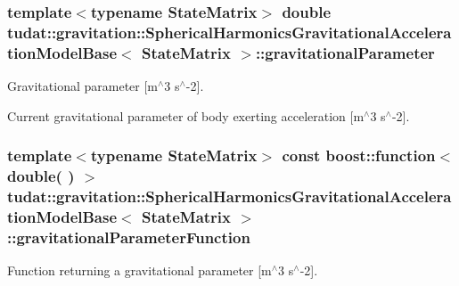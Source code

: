 \subsubsection[{\texorpdfstring{gravitational\+Parameter}{gravitationalParameter}}]{\setlength{\rightskip}{0pt plus 5cm}template$<$typename State\+Matrix$>$ double {\bf tudat\+::gravitation\+::\+Spherical\+Harmonics\+Gravitational\+Acceleration\+Model\+Base}$<$ State\+Matrix $>$\+::gravitational\+Parameter\hspace{0.3cm}{\ttfamily [protected]}}\hypertarget{classtudat_1_1gravitation_1_1SphericalHarmonicsGravitationalAccelerationModelBase_a6324fd00981daa580fab84e579de285f}{}\label{classtudat_1_1gravitation_1_1SphericalHarmonicsGravitationalAccelerationModelBase_a6324fd00981daa580fab84e579de285f}


Gravitational parameter \mbox{[}m$^\wedge$3 s$^\wedge$-\/2\mbox{]}. 

Current gravitational parameter of body exerting acceleration \mbox{[}m$^\wedge$3 s$^\wedge$-\/2\mbox{]}. 
\subsubsection[{\texorpdfstring{gravitational\+Parameter\+Function}{gravitationalParameterFunction}}]{\setlength{\rightskip}{0pt plus 5cm}template$<$typename State\+Matrix$>$ const boost\+::function$<$ double( ) $>$ {\bf tudat\+::gravitation\+::\+Spherical\+Harmonics\+Gravitational\+Acceleration\+Model\+Base}$<$ State\+Matrix $>$\+::gravitational\+Parameter\+Function\hspace{0.3cm}{\ttfamily [protected]}}\hypertarget{classtudat_1_1gravitation_1_1SphericalHarmonicsGravitationalAccelerationModelBase_a858ce486036b01aa152cea22561210ae}{}\label{classtudat_1_1gravitation_1_1SphericalHarmonicsGravitationalAccelerationModelBase_a858ce486036b01aa152cea22561210ae}


Function returning a gravitational parameter \mbox{[}m$^\wedge$3 s$^\wedge$-\/2\mbox{]}. 

